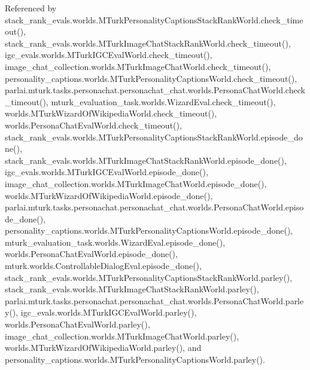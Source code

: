 Referenced by stack\+\_\+rank\+\_\+evals.\+worlds.\+M\+Turk\+Personality\+Captions\+Stack\+Rank\+World.\+check\+\_\+timeout(), stack\+\_\+rank\+\_\+evals.\+worlds.\+M\+Turk\+Image\+Chat\+Stack\+Rank\+World.\+check\+\_\+timeout(), igc\+\_\+evals.\+worlds.\+M\+Turk\+I\+G\+C\+Eval\+World.\+check\+\_\+timeout(), image\+\_\+chat\+\_\+collection.\+worlds.\+M\+Turk\+Image\+Chat\+World.\+check\+\_\+timeout(), personality\+\_\+captions.\+worlds.\+M\+Turk\+Personality\+Captions\+World.\+check\+\_\+timeout(), parlai.\+mturk.\+tasks.\+personachat.\+personachat\+\_\+chat.\+worlds.\+Persona\+Chat\+World.\+check\+\_\+timeout(), mturk\+\_\+evaluation\+\_\+task.\+worlds.\+Wizard\+Eval.\+check\+\_\+timeout(), worlds.\+M\+Turk\+Wizard\+Of\+Wikipedia\+World.\+check\+\_\+timeout(), worlds.\+Persona\+Chat\+Eval\+World.\+check\+\_\+timeout(), stack\+\_\+rank\+\_\+evals.\+worlds.\+M\+Turk\+Personality\+Captions\+Stack\+Rank\+World.\+episode\+\_\+done(), stack\+\_\+rank\+\_\+evals.\+worlds.\+M\+Turk\+Image\+Chat\+Stack\+Rank\+World.\+episode\+\_\+done(), igc\+\_\+evals.\+worlds.\+M\+Turk\+I\+G\+C\+Eval\+World.\+episode\+\_\+done(), image\+\_\+chat\+\_\+collection.\+worlds.\+M\+Turk\+Image\+Chat\+World.\+episode\+\_\+done(), worlds.\+M\+Turk\+Wizard\+Of\+Wikipedia\+World.\+episode\+\_\+done(), parlai.\+mturk.\+tasks.\+personachat.\+personachat\+\_\+chat.\+worlds.\+Persona\+Chat\+World.\+episode\+\_\+done(), personality\+\_\+captions.\+worlds.\+M\+Turk\+Personality\+Captions\+World.\+episode\+\_\+done(), mturk\+\_\+evaluation\+\_\+task.\+worlds.\+Wizard\+Eval.\+episode\+\_\+done(), worlds.\+Persona\+Chat\+Eval\+World.\+episode\+\_\+done(), mturk.\+worlds.\+Controllable\+Dialog\+Eval.\+episode\+\_\+done(), stack\+\_\+rank\+\_\+evals.\+worlds.\+M\+Turk\+Personality\+Captions\+Stack\+Rank\+World.\+parley(), stack\+\_\+rank\+\_\+evals.\+worlds.\+M\+Turk\+Image\+Chat\+Stack\+Rank\+World.\+parley(), parlai.\+mturk.\+tasks.\+personachat.\+personachat\+\_\+chat.\+worlds.\+Persona\+Chat\+World.\+parley(), igc\+\_\+evals.\+worlds.\+M\+Turk\+I\+G\+C\+Eval\+World.\+parley(), worlds.\+Persona\+Chat\+Eval\+World.\+parley(), image\+\_\+chat\+\_\+collection.\+worlds.\+M\+Turk\+Image\+Chat\+World.\+parley(), worlds.\+M\+Turk\+Wizard\+Of\+Wikipedia\+World.\+parley(), and personality\+\_\+captions.\+worlds.\+M\+Turk\+Personality\+Captions\+World.\+parley().

\mbox{\label{classigc__evals_1_1worlds_1_1MTurkIGCEvalWorld_a217e4c01c668988579b89568f8d240fd}} 
